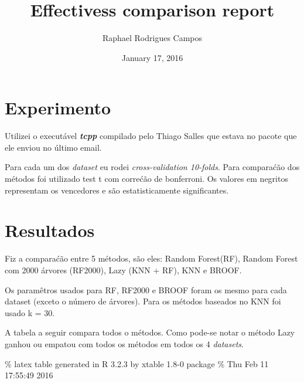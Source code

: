 \documentclass[]{article}
\title{Effectivess comparison report}
\author{Raphael Rodrigues Campos}
\date{January 17, 2016}
\begin{document}
\maketitle


\section{Experimento}\label{experimento}

Utilizei o executável \textbf{\emph{tcpp}} compilado pelo Thiago Salles
que estava no pacote que ele enviou no último email.

Para cada um dos \emph{dataset} eu rodei \emph{cross-validation
10-folds}. Para comparaćão dos métodos foi utilizado test t com correćão
de bonferroni. Os valores em negritos representam os vencedores e são
estatisticamente significantes.

\section{Resultados}\label{resultados}

Fiz a comparaćão entre 5 métodos, são eles: Random Forest(RF), Random
Forest com 2000 árvores (RF2000), Lazy (KNN + RF), KNN e BROOF.

Os paramêtros usados para RF, RF2000 e BROOF foram os mesmo para cada
dataset (exceto o número de árvores). Para os métodos baseados no KNN
foi usado k = 30.

A tabela a seguir compara todos o métodos. Como pode-se notar o método
Lazy ganhou ou empatou com todos os métodos em todos os 4
\emph{datasets}.

\% latex table generated in R 3.2.3 by xtable 1.8-0 package \% Thu Feb
11 17:55:49 2016
\end{document}
